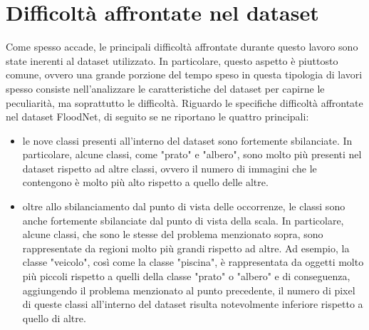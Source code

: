 \section{Difficoltà affrontate nel dataset}
\label{difficolta_ds}
Come spesso accade, le principali difficoltà affrontate durante questo lavoro sono state inerenti al dataset utilizzato. In particolare, questo aspetto è piuttosto comune, ovvero una grande porzione del tempo speso in questa tipologia di lavori spesso consiste nell'analizzare le caratteristiche del dataset per capirne le peculiarità, ma soprattutto le difficoltà.
Riguardo le specifiche difficoltà affrontate nel dataset FloodNet, di seguito se ne riportano le quattro principali:
\begin{itemize}
    \item le nove classi presenti all'interno del dataset sono fortemente sbilanciate. In particolare, alcune classi, come  "prato" e "albero", sono molto più presenti nel dataset rispetto ad altre classi, ovvero il numero di immagini che le contengono è molto più alto rispetto a quello delle altre.
    
    
    \item oltre allo sbilanciamento dal punto di vista delle occorrenze, le classi sono anche fortemente sbilanciate dal punto di vista della scala. In particolare, alcune classi, che sono  le stesse del problema menzionato sopra, sono rappresentate da regioni molto più grandi rispetto ad altre. Ad esempio, la classe "veicolo", così come la classe "piscina", è rappresentata da oggetti molto più piccoli rispetto a quelli della classe "prato" o "albero" e di conseguenza, aggiungendo il problema menzionato al punto precedente, il numero di pixel di queste classi all'interno del dataset risulta notevolmente  inferiore rispetto a quello di altre.


\end{itemize}
